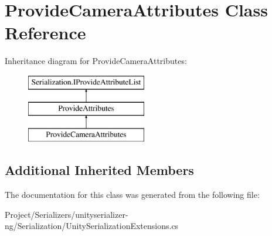 \hypertarget{class_provide_camera_attributes}{}\section{Provide\+Camera\+Attributes Class Reference}
\label{class_provide_camera_attributes}
Inheritance diagram for Provide\+Camera\+Attributes\+:\begin{figure}[H]
\begin{center}
\leavevmode
\includegraphics[height=3.000000cm]{class_provide_camera_attributes}
\end{center}
\end{figure}
\subsection*{Additional Inherited Members}


The documentation for this class was generated from the following file\+:\begin{DoxyCompactItemize}
\item 
Project/\+Serializers/unityserializer-\/ng/\+Serialization/Unity\+Serialization\+Extensions.\+cs\end{DoxyCompactItemize}
